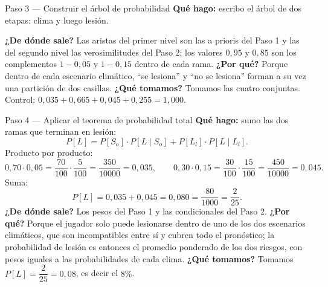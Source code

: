 \documentclass[11pt]{article}
\begin{document}
\begin{sol}
\begin{paso}{Paso 3 --- Construir el \'arbol de probabilidad}
\textbf{Qu\'e hago:} escribo el \'arbol de dos etapas: clima y luego lesi\'on.

\begin{center}
\shorthandoff{<>}
\shorthandon{<>}
\end{center}

\textbf{¿De d\'onde sale?} Las aristas del primer nivel son las a prioris del Paso 1 y las del segundo nivel las verosimilitudes del Paso 2; los valores $0{,}95$ y $0{,}85$ son los complementos $1-0{,}05$ y $1-0{,}15$ dentro de cada rama.
\textbf{¿Por qu\'e?} Porque dentro de cada escenario clim\'atico, ``se lesiona'' y ``no se lesiona'' forman a su vez una partici\'on de dos casillas.
\textbf{¿Qu\'e tomamos?} Tomamos las cuatro conjuntas. Control: $0{,}035+0{,}665+0{,}045+0{,}255=1{,}000$.
\end{paso}

\begin{paso}{Paso 4 --- Aplicar el teorema de probabilidad total}
\textbf{Qu\'e hago:} sumo las dos ramas que terminan en lesi\'on:
\[
P[L]=P[S_{o}]\cdot P[L\mid S_{o}]+P[L_{l}]\cdot P[L\mid L_{l}].
\]
Producto por producto:
\[
0{,}70\cdot 0{,}05=\frac{70}{100}\cdot\frac{5}{100}=\frac{350}{10000}=0{,}035,
\qquad
0{,}30\cdot 0{,}15=\frac{30}{100}\cdot\frac{15}{100}=\frac{450}{10000}=0{,}045 .
\]
Suma:
\[
P[L]=0{,}035+0{,}045=0{,}080=\frac{80}{1000}=\frac{2}{25}.
\]
\textbf{¿De d\'onde sale?} Los pesos del Paso 1 y las condicionales del Paso 2.
\textbf{¿Por qu\'e?} Porque el jugador solo puede lesionarse dentro de uno de los dos escenarios clim\'aticos, que son incompatibles entre s\'i y cubren todo el pron\'ostico; la probabilidad de lesi\'on es entonces el promedio ponderado de los dos riesgos, con pesos iguales a las probabilidades de cada clima.
\textbf{¿Qu\'e tomamos?} Tomamos $P[L]=\dfrac{2}{25}=0{,}08$, es decir el $8\%$.
\end{paso}


\end{sol}
\end{document}
